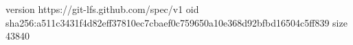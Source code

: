 version https://git-lfs.github.com/spec/v1
oid sha256:a511c3431f4d82eff37810ec7cbaef0c759650a10e368d92bfbd16504c5ff839
size 43840
